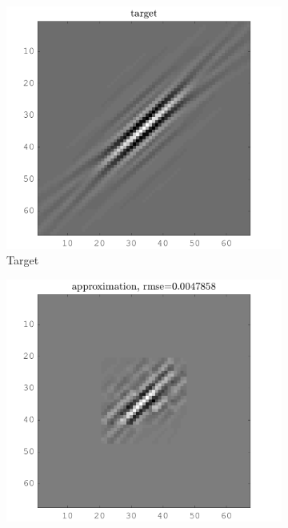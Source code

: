 \begin{figure}[!h]\centering
\begin{subfigure}[b]{0.49\textwidth}\centering
\includegraphics[width=\textwidth]{figures/xp/xp_128x128_sc2_angl1_K3_S3_node4_target.png}
\caption{Target}
\end{subfigure}
\begin{subfigure}[b]{0.49\textwidth}\centering
\includegraphics[width=\textwidth]{figures/xp/xp_128x128_sc2_angl1_K3_S3_node4_approx.png}

\end{subfigure}
\end{figure}
